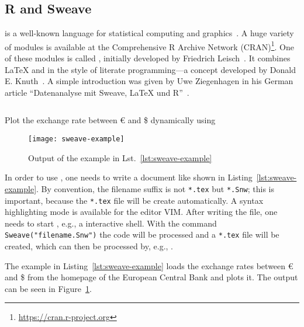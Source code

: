 \subsection{R and Sweave}

 is a well-known language for statistical computing and
graphics~\cite{Ihaka1998}.  A huge variety of modules is available at the
Comprehensive R Archive Network (CRAN)\footnote{%
  \href{https://cran.r-project.org}{https://cran.r-project.org}}.  One of these
modules is called , initially developed by Friedrich
Leisch~\cite{Leisch2002}.  It combines \LaTeX{} and  in the style of
literate programming—a concept developed by Donald E\@. Knuth~\cite{Knuth1992}.
A simple introduction was given by Uwe Ziegenhagen in his German article
\enquote{Datenanalyse mit Sweave, \LaTeX{} und R}~\cite{Ziegenhagen2010}.

\begin{listing}[H]
  \inputminted{latex}{../examples/sweave-example.Snw}
  \caption{Plot the exchange rate between \euro{} and \$ dynamically using
    }
  \label{lst:sweave-example}
\end{listing}

\begin{figure}[!t]
  \texttt{[image: sweave-example]}
  \caption{Output of the  example in
    Lst.~\ref{lst:sweave-example}}
  \label{fig:sweave-example}
\end{figure}

In order to use , one needs to write a document like shown in
Listing~\ref{lst:sweave-example}.  By convention, the filename suffix is not
\texttt{*.tex} but \texttt{*.Snw}; this is important, because the \texttt{*.tex}
file will be create automatically.  A syntax highlighting mode is available for
the editor VIM\@.  After writing the file, one needs to start ,
e.g., a  interactive shell.  With the command
\texttt{Sweave("filename.Snw")} the  code will be processed
and a \texttt{*.tex} file will be created, which can then be processed by, e.g.,
.

The example in Listing~\ref{lst:sweave-example} loads the exchange rates between
\euro{} and \$ from the homepage of the European Central Bank and plots it. The
output can be seen in Figure~\ref{fig:sweave-example}.
